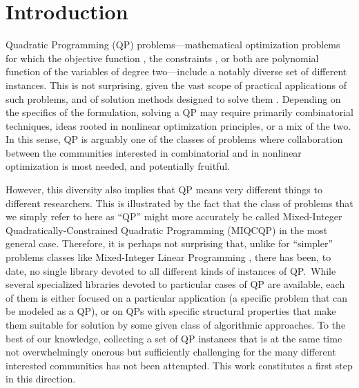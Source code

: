 
\section{Introduction}\label{sec:intro}

Quadratic Programming (QP) problems---mathematical optimization problems for which the objective function \cite{wiki:qp}, the constraints \cite{wiki:qcqp}, or both are polynomial function of the variables of degree two---include a notably diverse set of different instances. This is not surprising, given the vast scope of practical applications of such problems, and of solution methods designed to solve them \cite{GoulToin00a}. Depending on the specifics of the formulation, solving a QP may require primarily combinatorial techniques, ideas rooted in nonlinear optimization principles, or a mix of the two. In this sense, QP is arguably one of the classes of problems where collaboration between the communities interested in combinatorial and in nonlinear optimization is most needed, and potentially fruitful.

However, this diversity also implies that QP means very different things to different researchers. This is illustrated by the fact that the class of problems that we simply refer to here as ``QP'' might more accurately be called Mixed-Integer Quadratically-Constrained Quadratic Programming (MIQCQP) in the most general case. Therefore, it is perhaps not surprising that, unlike for ``simpler'' problems classes like Mixed-Integer Linear Programming \cite{Koch2011},  there has been, to date, no single library devoted to all different kinds of instances of QP.\ While several specialized libraries devoted to particular cases of QP are available, each of them is either focused on a particular application (a specific problem that can be modeled as a QP), or on QPs with specific structural properties that make them suitable for solution by some given class of algorithmic approaches. To the best of our knowledge, collecting a set of QP instances that is at the same time not overwhelmingly onerous but sufficiently challenging for the many different interested communities has not been attempted. This work constitutes a first step in this direction.

